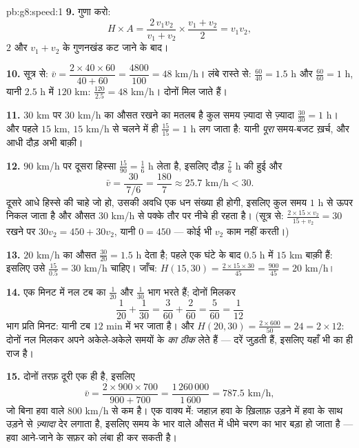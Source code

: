 \begin{solution}{pb:g8:speed:1}
\textbf{9.} गुणा करो:
\[
H \times A
= \frac{2\, v_1 v_2}{v_1 + v_2} \times \frac{v_1 + v_2}{2}
= v_1 v_2 ,
\]
$2$ और $v_1 + v_2$ के गुणनखंड कट जाने के बाद।

\textbf{10.} सूत्र से: $\bar v = \dfrac{2 \times 40 \times 60}
{40 + 60} = \dfrac{4800}{100} = 48$ km/h। लंबे रास्ते से:
$\frac{60}{40} = 1.5$ h और $\frac{60}{60} = 1$ h, यानी $2.5$ h में
$120$ km: $\frac{120}{2.5} = 48$ km/h। दोनों मिल जाते हैं।

\textbf{11.} $30$ km पर $30$ km/h का औसत रखने का मतलब है कुल समय
ज़्यादा से ज़्यादा $\frac{30}{30} = 1$ h। और पहले $15$ km,
$15$ km/h से चलने में ही $\frac{15}{15} = 1$ h लग जाता है: यानी
\emph{पूरा} समय-बजट ख़र्च, और आधी दौड़ अभी बाक़ी।

\textbf{12.} $90$ km/h पर दूसरा  हिस्सा
$\frac{15}{90} = \frac16$ h लेता है, इसलिए दौड़ $\frac76$ h की हुई
और
\[
\bar v = \frac{30}{\ 7/6\ } = \frac{180}{7} \approx 25.7
\text{ km/h} < 30 .
\]
दूसरे आधे हिस्से की  चाहे जो हो, उसकी अवधि एक धन संख्या ही
होगी, इसलिए कुल समय $1$ h से ऊपर निकल जाता है और औसत $30$ km/h से
पक्के तौर पर नीचे ही रहता है। (सूत्र से: $\frac{2 \times 15
\times v_2}{15 + v_2} = 30$ रखने पर $30 v_2 = 450 + 30 v_2$, यानी
$0 = 450$ --- कोई भी  $v_2$ काम नहीं करती।)

\textbf{13.} $20$ km/h का औसत $\frac{30}{20} = 1.5$ h देता है;
पहले एक घंटे के बाद $0.5$ h में $15$ km बाक़ी हैं: इसलिए उसे
$\frac{15}{0.5} = 30$ km/h चाहिए। जाँच:
$H(15, 30) = \frac{2 \times 15 \times 30}{45} = \frac{900}{45}
= 20$ km/h।

\textbf{14.} एक मिनट में नल टब का $\frac{1}{20}$ और
$\frac{1}{30}$ भाग भरते हैं; दोनों मिलकर
\[
\frac{1}{20} + \frac{1}{30}
= \frac{3}{60} + \frac{2}{60}
= \frac{5}{60} = \frac{1}{12}
\]
भाग प्रति मिनट: यानी टब $12$ min में भर जाता है। और
$H(20, 30) = \frac{2 \times 600}{50} = 24 = 2 \times 12$: दोनों नल
मिलकर अपने अकेले-अकेले समयों के \emph{ का ठीक }
लेते हैं --- दरें जुड़ती हैं, इसलिए यहाँ भी  का ही राज
है।

\textbf{15.} दोनों तरफ़ दूरी एक ही है, इसलिए
\[
\bar v = \frac{2 \times 900 \times 700}{900 + 700}
= \frac{1\,260\,000}{1\,600} = 787.5 \text{ km/h},
\]
जो बिना हवा वाले $800$ km/h से कम है। एक वाक्य में: जहाज़ हवा के
ख़िलाफ़ उड़ने में हवा के साथ उड़ने से \emph{ज़्यादा} देर लगाता है,
इसलिए समय के भार वाले औसत में धीमे चरण का भार बड़ा हो जाता है ---
हवा आने-जाने के सफ़र को लंबा ही कर सकती है।

\end{solution}
